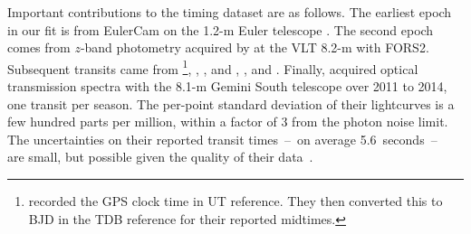 \documentclass[12pt,twocolumn,tighten]{aastex62}
\begin{document}
Important contributions to the timing dataset are as follows.  The
earliest epoch in our fit is from EulerCam on the 1.2-m Euler telescope
\citep{wilson_wasp-4b_2008}.  The second epoch comes from
$z$-band photometry acquired by \citet{gillon_improved_2009} at the VLT
8.2-m with FORS2.  Subsequent transits came from
\citet{winn_transit_2009}\footnote{\citet{winn_transit_2009} recorded
the GPS clock time in UT reference. They then converted this to BJD in
the TDB reference for their reported midtimes.},
\citet{dragomir_terms_2011}, \citet{sanchis-ojeda_starspots_2011}, and
\citet{nikolov_wasp-4b_2012}, \citet{hoyer_tramos_2013}, and
\citet{ranjan_atmospheric_2014}.
Finally, \citet{huitson_gemini_2017} acquired optical transmission
spectra with the 8.1-m Gemini South telescope over 2011 to 2014, one
transit per season.  The per-point standard deviation of their
lightcurves is a few hundred parts per million, within a factor of 3
from the photon noise limit.  The uncertainties on their reported
transit times~--~on average 5.6~seconds~--~ are small, but possible
given the quality of their data~\citep[cf.][]{carter_analytic_2008}.
\end{document}
